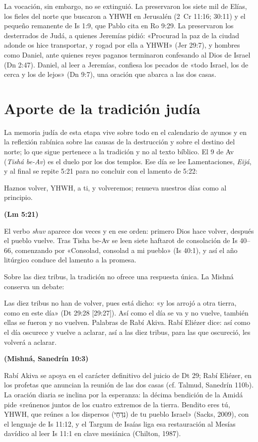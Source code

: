 \documentclass[11pt,letterpaper]{article}
\newcommand{\heb}[1]{\mbox{\foreignlanguage{hebrew}{#1}}}
\newcommand{\fuente}[1]{\par\hfill{\upshape\bfseries\small\textcolor{ladrillo}{#1}}}
\begin{document}
La vocación, sin embargo, no se extinguió. La preservaron los siete mil de Elías, los fieles del norte que buscaron a YHWH en Jerusalén (2~Cr 11:16; 30:11) y el pequeño remanente de Is 1:9, que Pablo cita en Ro 9:29. La preservaron los desterrados de Judá, a quienes Jeremías pidió: «Procurad la paz de la ciudad adonde os hice transportar, y rogad por ella a YHWH» (Jer 29:7), y hombres como Daniel, ante quienes reyes paganos terminaron confesando al Dios de Israel (Dn 2:47). Daniel, al leer a Jeremías, confiesa los pecados de «todo Israel, los de cerca y los de lejos» (Dn 9:7), una oración que abarca a las dos casas.

\section{Aporte de la tradición judía}

La memoria judía de esta etapa vive sobre todo en el calendario de ayunos y en la reflexión rabínica sobre las causas de la destrucción y sobre el destino del norte; lo que sigue pertenece a la tradición y no al texto bíblico. El 9 de Av (\emph{Tishá be-Av}) es el duelo por los dos templos. Ese día se lee Lamentaciones, \emph{Eijá}, y al final se repite 5:21 para no concluir con el lamento de 5:22:
\begin{cita}Haznos volver, YHWH, a ti, y volveremos; renueva nuestros días como al principio.\fuente{(Lm 5:21)}\end{cita}
El verbo \emph{shuv} aparece dos veces y en ese orden: primero Dios hace volver, después el pueblo vuelve. Tras Tisha be-Av se leen siete haftarot de consolación de Is 40--66, comenzando por «Consolad, consolad a mi pueblo» (Is 40:1), y así el año litúrgico conduce del lamento a la promesa.

Sobre las diez tribus, la tradición no ofrece una respuesta única. La Mishná conserva un debate:
\begin{cita}Las diez tribus no han de volver, pues está dicho: «y los arrojó a otra tierra, como en este día» (Dt 29:28 [29:27]). Así como el día se va y no vuelve, también ellas se fueron y no vuelven. Palabras de Rabí Akiva. Rabí Eliézer dice: así como el día oscurece y vuelve a aclarar, así a las diez tribus, para las que oscureció, les volverá a aclarar.\fuente{(Mishná, Sanedrín 10:3)}\end{cita}
Rabí Akiva se apoya en el carácter definitivo del juicio de Dt 29; Rabí Eliézer, en los profetas que anuncian la reunión de las dos casas (cf. Talmud, Sanedrín 110b). La oración diaria se inclina por la esperanza: la décima bendición de la Amidá pide «reúnenos juntos de los cuatro extremos de la tierra. Bendito eres tú, YHWH, que reúnes a los dispersos (\heb{נִדְחֵי}) de tu pueblo Israel» (Sacks, 2009), con el lenguaje de Is 11:12, y el Targum de Isaías liga esa restauración al Mesías davídico al leer Is 11:1 en clave mesiánica (Chilton, 1987).
\end{document}
